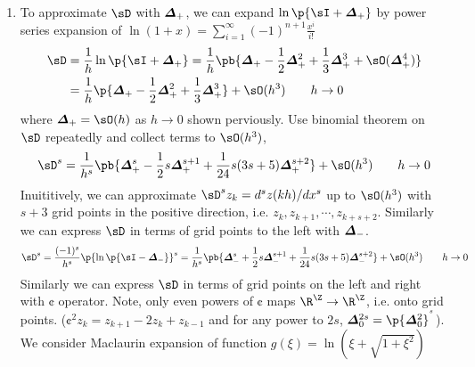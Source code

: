 \documentclass[11pt]{article}
\begin{document}
\begin{enumerate}
\begin{proof}
        From previous, $\shift = \id + \forw = \p{\id - \back}^{-1}$. For the last expression, consider
        \begin{align*}
            \cent &= \shift^{1/2} - \shift^{-1/2} \\
            \shift^{1/2} \cent &= \shift - \id \\
            (\shift^{1/2})^2 - \shift^{1/2}\cent - \id &= 0\\
            \shift^{1/2} &= \frac{1}{2} \cent \pm \sqrt{\id + \frac{1}{4}\cent^2} \tag{$+$ is correct}\\
            \shift &= \p{
                \frac{1}{2}\cent + \sqrt{\id + \frac{1}{4}\cent^2}
            }^2
        \end{align*}
    \end{proof}
    \item {} To approximate $\diff$ with $\boldsymbol{\varDelta}_+$, we can expand $\ln\p{\id + \forw}$ by power series expansion of $\ln(1+x) = \textstyle\sum_{i=1}^{\infty} (-1)^{n+1} \frac{x^i}{i!}$ 
    \begin{align*}
        \diff 
        &= \frac{1}{h} \ln\p{\id + \forw}
        = \frac{1}{h} \pb{
            \forw - \frac{1}{2} \forw^2 + \frac{1}{3} \forw^3 + \sO(\forw^4)
        } \\
        &= \frac{1}{h} \p{
            \forw - \frac{1}{2} \forw^2 + \frac{1}{3} \forw^3
        } + \sO(h^3) \quad \quad h\to 0
    \end{align*}
    where $\forw = \sO(h)$ as $h\to 0$ shown perviously. Use binomial theorem on $\diff$ repeatedly and collect terms to $\sO(h^3)$, 
    \[
        \diff^s = \frac{1}{h^s}\pb{
            \forw^s - \frac{1}{2} s \forw^{s+1} + \frac{1}{24} s(3s + 5) \forw^{s+2}
        } + \sO(h^3)  \quad \quad h\to 0
    \]
    Inuititively, we can approximate $\diff^s z_k = d^s z(kh)/ dx^s$ up to $\sO(h^3)$ with $s+3$ grid points in the positive direction, i.e. $z_k, z_{k+1}, \cdots, z_{k+s+2}$. Similarly we can express $\diff$ in terms of grid points to the left with $\boldsymbol{\varDelta}_-$.
    \[
        \diff^s = \frac{(-1)^s}{h^s} \p{\ln\p{\id - \back}}^s
        = \frac{1}{h^s} \pb{
            \back^s + \frac{1}{2} s \back^{s+1} + \frac{1}{24} s(3s + 5) \back^{s+2}
        } + \sO(h^3)  \quad \quad h\to 0
    \]
    Similarly we can express $\diff$ in terms of grid points on the left and right with $\cent$ operator. Note, only even powers of $\cent$ maps $\R^{\Z} \to \R^{\Z}$, i.e. onto grid points. ($\cent^2 z_k = z_{k+1} -2z_k + z_{k-1}$ and for any power to $2s$, $\cent^{2s} = \p{\cent^2}^{^s}$). We consider Maclaurin expansion of function $g(\xi) = \ln(\xi + \sqrt{1+\xi^2})$

\end{enumerate}
\end{document}
